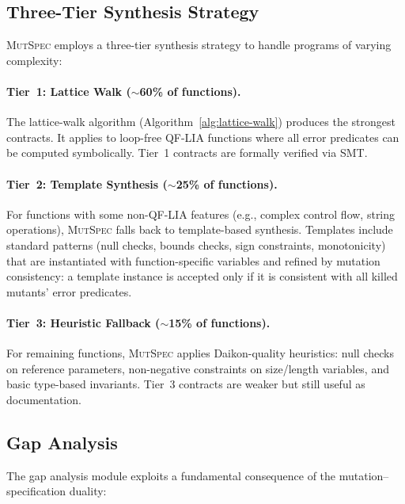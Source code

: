 \documentclass[11pt]{article}
\begin{document}
\subsection{Three-Tier Synthesis Strategy}
\label{sec:tiers}

\textsc{MutSpec} employs a three-tier synthesis strategy to handle programs of
varying complexity:

\paragraph{Tier~1: Lattice Walk ($\sim$60\% of functions).}
The lattice-walk algorithm (Algorithm~\ref{alg:lattice-walk}) produces the
strongest contracts. It applies to loop-free QF-LIA functions where all error
predicates can be computed symbolically. Tier~1 contracts are formally verified
via SMT.

\paragraph{Tier~2: Template Synthesis ($\sim$25\% of functions).}
For functions with some non-QF-LIA features (e.g., complex control flow,
string operations), \textsc{MutSpec} falls back to template-based synthesis.
Templates include standard patterns (null checks, bounds checks, sign
constraints, monotonicity) that are instantiated with function-specific variables
and refined by mutation consistency: a template instance is accepted only if it
is consistent with all killed mutants' error predicates.

\paragraph{Tier~3: Heuristic Fallback ($\sim$15\% of functions).}
For remaining functions, \textsc{MutSpec} applies Daikon-quality heuristics:
null checks on reference parameters, non-negative constraints on size/length
variables, and basic type-based invariants. Tier~3 contracts are weaker but
still useful as documentation.

\subsection{Gap Analysis}
\label{sec:gap-analysis}

The gap analysis module exploits a fundamental consequence of the
mutation--specification duality:
\end{document}
